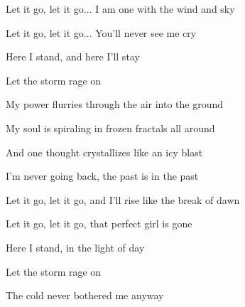 \begin{song}
\bigskip

Let it go, let it go... I am one with the wind and sky \par
Let it go, let it go... You'll never see me cry \par
{}Here I stand, and here I'll stay \par
Let the storm rage on  \par

\bigskip

 My power flurries through the air into the ground \par
{} My soul is spiraling in frozen fractals all around \par
{} And one thought crystallizes like an icy blast \par
{} I'm never going back, the past is in the past \par
{}  \par

\bigskip

Let it go, let it go, and I'll rise like the break of dawn \par
Let it go, let it go, that perfect girl is gone \par
{}Here I stand, in the light of day \par
{} Let the storm rage on \par
The cold never bothered me anyway \par

\end{song}